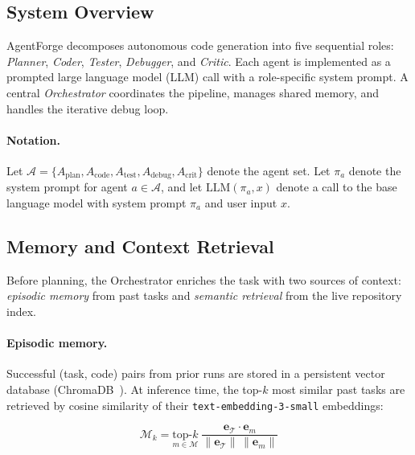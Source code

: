 \subsection{System Overview}
\label{sec:overview}

AgentForge decomposes autonomous code generation into five
sequential roles: \textit{Planner}, \textit{Coder},
\textit{Tester}, \textit{Debugger}, and \textit{Critic}.
Each agent is implemented as a prompted large language model
(LLM) call with a role-specific system prompt. A central
\textit{Orchestrator} coordinates the pipeline, manages
shared memory, and handles the iterative debug loop.

\paragraph{Notation.}
Let $\mathcal{A} = \{A_\text{plan}, A_\text{code},
A_\text{test}, A_\text{debug}, A_\text{crit}\}$ denote the
agent set. Let $\pi_a$ denote the system prompt for agent
$a \in \mathcal{A}$, and let $\text{LLM}(\pi_a, x)$ denote
a call to the base language model with system prompt $\pi_a$
and user input $x$.

\subsection{Memory and Context Retrieval}
\label{sec:memory}

Before planning, the Orchestrator enriches the task with
two sources of context: \textit{episodic memory} from past
tasks and \textit{semantic retrieval} from the live
repository index.

\paragraph{Episodic memory.}
Successful (task, code) pairs from prior runs are stored in
a persistent vector database (ChromaDB~\cite{chromadb}).
At inference time, the top-$k$ most similar past tasks are
retrieved by cosine similarity of their
\texttt{text-embedding-3-small} embeddings:

\begin{equation}
  \mathcal{M}_k = \underset{m \in \mathcal{M}}{\text{top-}k}
  \;\frac{\mathbf{e}_\mathcal{T} \cdot \mathbf{e}_m}
         {\|\mathbf{e}_\mathcal{T}\|\,\|\mathbf{e}_m\|}
\end{equation}

